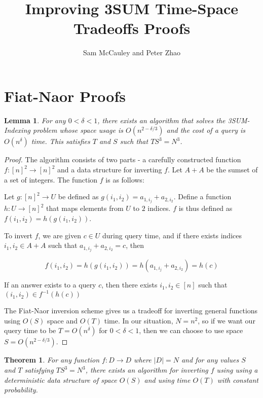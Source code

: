 \documentclass{article}
\title{Improving 3SUM Time-Space Tradeoffs Proofs}
\author{Sam McCauley and Peter Zhao}
\date{}
\newtheorem{theorem}{Theorem}
\newtheorem{lemma}{Lemma}
\begin{document}
\maketitle

\section{Fiat-Naor Proofs}
\label{sec:fiat-naor}

\begin{lemma}
\label{3SUM-Indexing}
For any $0 < \delta < 1$, there exists an algorithm that solves the 3SUM-Indexing problem whose space usage is $O(n^{2 - \delta/3})$ and the cost of a query is $O(n^{\delta})$ time. This satisfies $T$ and $S$ such that $TS^3 = N^3$.
\end{lemma}

\begin{proof}
The algorithm consists of two parts - a carefully constructed function $f:[n]^2 \rightarrow [n]^2$ and a data structure for inverting $f$. Let $A+A$ be the sumset of a set of integers. The function $f$ is as follows:

Let $g: [n]^2 \rightarrow U$ be defined as $g(i_1, i_2) = a_{1,i_j} + a_{2,i_2}$. Define a function $h: U \rightarrow [n]^2$ that maps elements from $U$ to $2$ indices. $f$ is thus defined as $f(i_1,i_2) = h(g(i_1,i_2))$.

To invert $f$, we are given $c \in U$ during query time, and if there exists indices $i_1,i_2 \in A+A$ such that $a_{1,i_j} + a_{2,i_2} = c$, then

$$f(i_1,i_2) = h(g(i_1,i_2)) = h(a_{1,i_j} + a_{2,i_2})= h(c)$$

If an answer exists to a query $c$, then there exists $i_1,i_2 \in [n]$ such that $(i_1,i_2) \in f^{-1}(h(c))$

The Fiat-Naor inversion scheme gives us a tradeoff for inverting general functions using $O(S)$ space and $O(T)$ time. In our situation, $N=n^2$, so if we want our query time to be $T=O(n^\delta)$ for $0 < \delta < 1$, then we can choose to use space $S = O(n^{2-\delta/3})$.
\end{proof}

\begin{theorem}
\label{Fiat-Naor}
For any function $f:D \rightarrow D$ where $|D| = N$ and for any values $S$ and $T$ satisfying $TS^3 = N^3$, there exists an algorithm for inverting $f$ using using a deterministic data structure of space $O(S)$ and using time $O(T)$ with constant probability.
\end{theorem}
\end{document}
